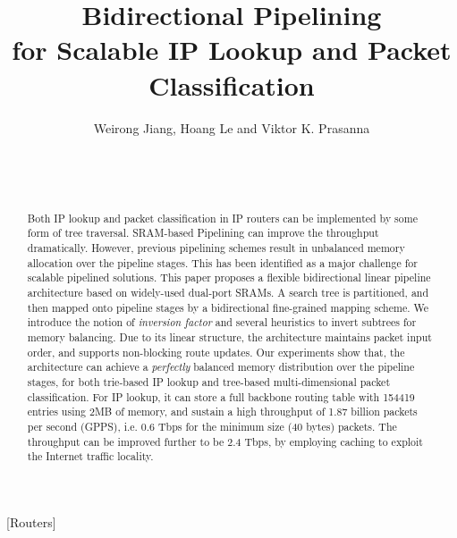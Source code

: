 \documentclass{sigcomm-alternate}
\begin{document}
\title{Bidirectional Pipelining \\for Scalable IP Lookup and Packet Classification}

 \author{
\alignauthor
Weirong Jiang, Hoang Le and Viktor K. Prasanna\\
       \\
       \\
       \\
}

\maketitle
\begin{abstract}
Both IP lookup and packet classification in IP routers can be implemented by some form of tree traversal. SRAM-based Pipelining can improve the throughput dramatically. However, previous pipelining schemes result in unbalanced memory allocation over the pipeline stages. This has been identified as a major challenge for scalable pipelined solutions. This paper proposes a flexible bidirectional linear pipeline architecture based on widely-used dual-port SRAMs. A search tree is partitioned, and then mapped onto pipeline stages by a bidirectional fine-grained mapping scheme. We introduce the notion of \textit{inversion factor} and several heuristics to invert subtrees for memory balancing. Due to its linear structure, the architecture maintains packet input order, and supports non-blocking route updates. Our experiments show that, the architecture can achieve a \textit{perfectly} balanced memory distribution over the pipeline stages, for both trie-based IP lookup and tree-based multi-dimensional packet classification. For IP lookup, it can store a full backbone routing table with 154419 entries using 2MB of memory, and sustain a high throughput of 1.87 billion packets per second (GPPS), i.e. 0.6 Tbps for the minimum size (40 bytes) packets. The throughput can be improved further to be 2.4 Tbps, by employing caching to exploit the Internet traffic locality. 

\end{abstract}

[Routers]
\end{document}
